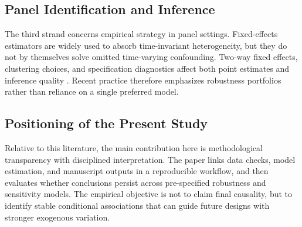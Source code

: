 \subsection{Panel Identification and Inference}

The third strand concerns empirical strategy in panel settings. Fixed-effects estimators are widely used to absorb time-invariant heterogeneity, but they do not by themselves solve omitted time-varying confounding. Two-way fixed effects, clustering choices, and specification diagnostics affect both point estimates and inference quality \cite{wooldridge2010,wooldridge2021}. Recent practice therefore emphasizes robustness portfolios rather than reliance on a single preferred model.

\subsection{Positioning of the Present Study}

Relative to this literature, the main contribution here is methodological transparency with disciplined interpretation. The paper links data checks, model estimation, and manuscript outputs in a reproducible workflow, and then evaluates whether conclusions persist across pre-specified robustness and sensitivity models. The empirical objective is not to claim final causality, but to identify stable conditional associations that can guide future designs with stronger exogenous variation.
